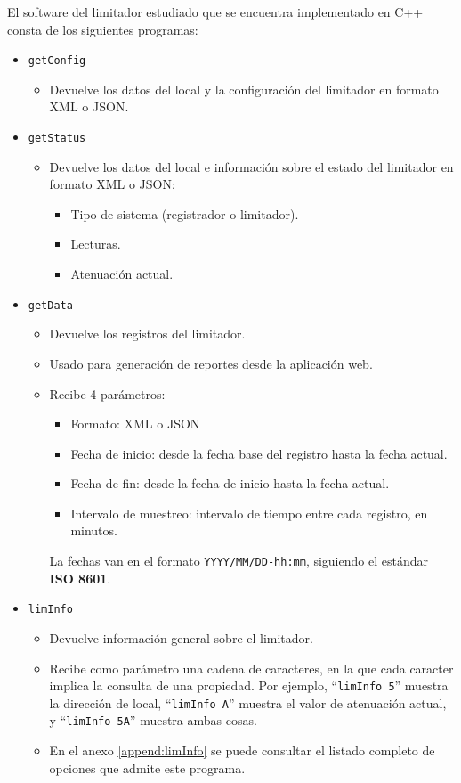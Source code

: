 El software del limitador estudiado que se encuentra implementado en C++ consta de los siguientes programas:
\begin{itemize}
    \item \verb|getConfig|
    \begin{itemize}
        \item Devuelve los datos del local y la configuración del limitador en formato \acrshort{XML} o \acrshort{JSON}.
    \end{itemize}

    \item \verb|getStatus|
    \begin{itemize}
        \item Devuelve los datos del local e información sobre el estado del limitador en formato \acrshort{XML} o \acrshort{JSON}:
        \begin{itemize}
            \item Tipo de sistema (registrador o limitador).
            \item Lecturas.
            \item Atenuación actual.
        \end{itemize}
    \end{itemize}

    \item \verb|getData|
    \begin{itemize}
        \item Devuelve los registros del limitador.
        \item Usado para generación de reportes desde la aplicación web.
        \item Recibe 4 parámetros:
        \begin{itemize}
            \item Formato: \acrshort{XML} o \acrshort{JSON}
            \item Fecha de inicio: desde la fecha base del registro hasta la fecha actual.
            \item Fecha de fin: desde la fecha de inicio hasta la fecha actual.
            \item Intervalo de muestreo: intervalo de tiempo entre cada registro, en minutos.
        \end{itemize}
        \subitem La fechas van en el formato \verb|YYYY/MM/DD-hh:mm|, siguiendo el estándar \textbf{ISO 8601}.
    \end{itemize}

    \item \verb|limInfo|
    \begin{itemize}
        \item Devuelve información general sobre el limitador.
        \item Recibe como parámetro una cadena de caracteres, en la que cada caracter implica la consulta de una propiedad. Por ejemplo, ``\verb|limInfo 5|'' muestra la dirección de local, ``\verb|limInfo A|'' muestra el valor de atenuación actual, y ``\verb|limInfo 5A|'' muestra ambas cosas.
        \item En el anexo \ref{append:limInfo} se puede consultar el listado completo de opciones que admite este programa.
    \end{itemize}


\end{itemize}

